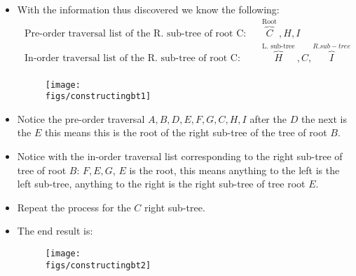 \begin{itemize}
    \item With the information thus discovered we know the following: 
        \begin{align*}
            \text{ Pre-order traversal list of the R. sub-tree of root C:}\quad & \overbrace{C}^{\text{ Root }},H,I \\
            \text{ In-order traversal list of the R. sub-tree of root C: }\quad & \overbrace{H}^{\text{ L. sub-tree }},C,\overbrace{I}^{R. sub-tree} \\
        \end{align*}
        \begin{figure}[H]
            \centering
            \texttt{[image: \\figs/constructingbt1]}
        \end{figure}
    
    \item Notice the pre-order traversal $A,B,D,E,F,G,C,H,I$ after the $D$ the next is the $E$ this means this is the root of the right sub-tree of the tree of root $B$. 
    \item Notice with the in-order traversal list corresponding to the right sub-tree of tree of root $B$: $F,E,G$, $E$ is the root, this means anything to the left is the left sub-tree, anything to the right is the right sub-tree of tree root $E$. 
    \item Repeat the process for the $C$ right sub-tree.
    \item The end result is:
        \begin{figure}[H]
            \centering
            \texttt{[image: \\figs/constructingbt2]}
        \end{figure}
\end{itemize}


